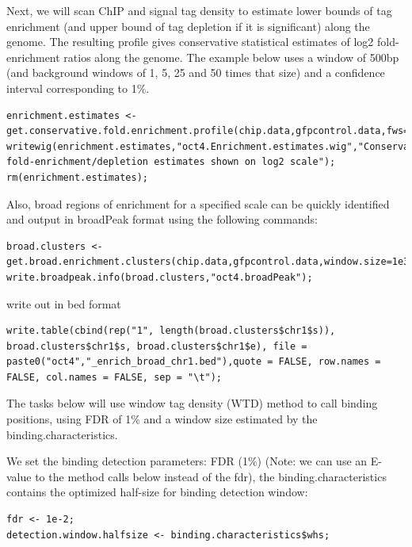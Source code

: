 \begin{steps}
Next, we will scan ChIP and signal tag density to estimate lower bounds of tag enrichment (and upper bound of tag depletion if it is significant) along the genome. 
The resulting profile gives conservative statistical estimates of log2 fold-enrichment ratios along the genome.
The example below uses a window of 500bp (and background windows of 1, 5, 25 and 50 times that size) and a confidence interval corresponding to 1\%.

\begin{lstlisting}
enrichment.estimates <- get.conservative.fold.enrichment.profile(chip.data,gfpcontrol.data,fws=500,step=100,alpha=0.01);
writewig(enrichment.estimates,"oct4.Enrichment.estimates.wig","Conservative fold-enrichment/depletion estimates shown on log2 scale");
rm(enrichment.estimates);
\end{lstlisting}
\end{steps}

\begin{steps}
Also, broad regions of enrichment for a specified scale can be quickly identified and output in broadPeak format using the following commands:

\begin{lstlisting}
broad.clusters <- get.broad.enrichment.clusters(chip.data,gfpcontrol.data,window.size=1e3,z.thr=3,tag.shift=round(binding.characteristics$peak$x/2));
write.broadpeak.info(broad.clusters,"oct4.broadPeak");
\end{lstlisting}
write out in bed format
\begin{lstlisting}
write.table(cbind(rep("1", length(broad.clusters$chr1$s)), broad.clusters$chr1$s, broad.clusters$chr1$e), file = paste0("oct4","_enrich_broad_chr1.bed"),quote = FALSE, row.names = FALSE, col.names = FALSE, sep = "\t");  
\end{lstlisting} 
\end{steps}


The tasks below will use window tag density (WTD) method to call binding positions, using FDR of 1\% and a window size estimated by the binding.characteristics.
\begin{steps}
We set the binding detection parameters: FDR (1\%) (Note: we can use an E-value to the method calls below instead of the fdr), the binding.characteristics contains the optimized half-size for binding detection window:
\begin{lstlisting}
fdr <- 1e-2; 
detection.window.halfsize <- binding.characteristics$whs;
\end{lstlisting}
\end{steps}


